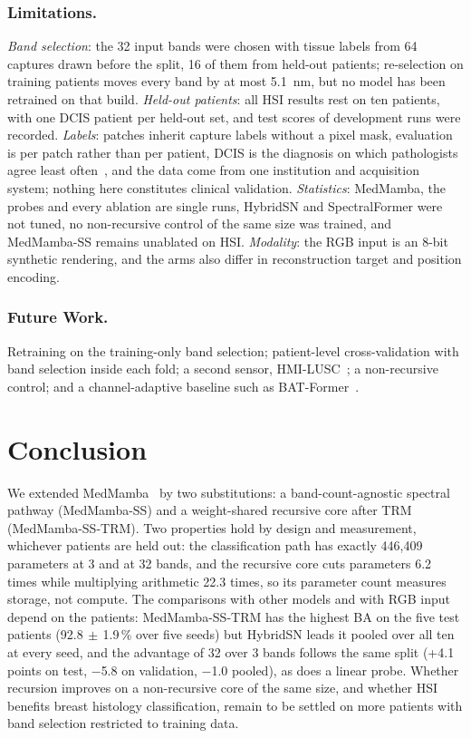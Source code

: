 \documentclass{svproc}
\newcommand{\ms}{\ensuremath{\,\pm\,}}   %
\begin{document}
\subsubsection{Limitations.}
\emph{Band selection}: the 32 input bands were chosen with tissue labels from 64 captures drawn before the split, 16 of them from held-out patients; re-selection on training patients moves every band by at most 5.1~nm, but no model has been retrained on that build. \emph{Held-out patients}: all HSI results rest on ten patients, with one DCIS patient per held-out set, and test scores of development runs were recorded. \emph{Labels}: patches inherit capture labels without a pixel mask, evaluation is per patch rather than per patient, DCIS is the diagnosis on which pathologists agree least often~\cite{elmore}, and the data come from one institution and acquisition system; nothing here constitutes clinical validation. \emph{Statistics}: MedMamba, the probes and every ablation are single runs, HybridSN and SpectralFormer were not tuned, no non-recursive control of the same size was trained, and MedMamba-SS remains unablated on HSI. \emph{Modality}: the RGB input is an 8-bit synthetic rendering, and the arms also differ in reconstruction target and position encoding.

\subsubsection{Future Work.}
Retraining on the training-only band selection; patient-level cross-validation with band selection inside each fold; a second sensor, HMI-LUSC~\cite{hmilusc}; a non-recursive control; and a channel-adaptive baseline such as BAT-Former~\cite{batformer}.

\section{Conclusion}
We extended MedMamba~\cite{medmamba} by two substitutions: a band-count-agnostic spectral pathway (MedMamba-SS) and a weight-shared recursive core after TRM~\cite{trm} (MedMamba-SS-TRM). Two properties hold by design and measurement, whichever patients are held out: the classification path has exactly 446,409 parameters at 3 and at 32 bands, and the recursive core cuts parameters 6.2 times while multiplying arithmetic 22.3 times, so its parameter count measures storage, not compute. The comparisons with other models and with RGB input depend on the patients: MedMamba-SS-TRM has the highest BA on the five test patients (92.8\ms1.9\,\% over five seeds) but HybridSN leads it pooled over all ten at every seed, and the advantage of 32 over 3 bands follows the same split (+4.1 points on test, $-$5.8 on validation, $-$1.0 pooled), as does a linear probe. Whether recursion improves on a non-recursive core of the same size, and whether HSI benefits breast histology classification, remain to be settled on more patients with band selection restricted to training data.
\end{document}
